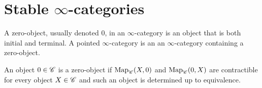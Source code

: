 \documentclass[../thesis.tex]{subfiles}
\begin{document}
\section{Stable $\infty$-categories}
\begin{definition}
    A zero-object, usually denoted $0$, in an $\infty$-category is an object that is both initial and terminal.
    A pointed $\infty$-category is an an $\infty$-category containing a zero-object.
\end{definition}
\begin{remark}
    An object $0\in \mathscr{C}$ is a zero-object if $\mathrm{Map}_{\mathscr{C}}(X,0)$ and $\mathrm{Map}_{\mathscr{C}}(0,X)$ are contractible for every object $X\in \mathscr{C}$ and such an object is determined up to equivalence.
\end{remark}
\end{document}
